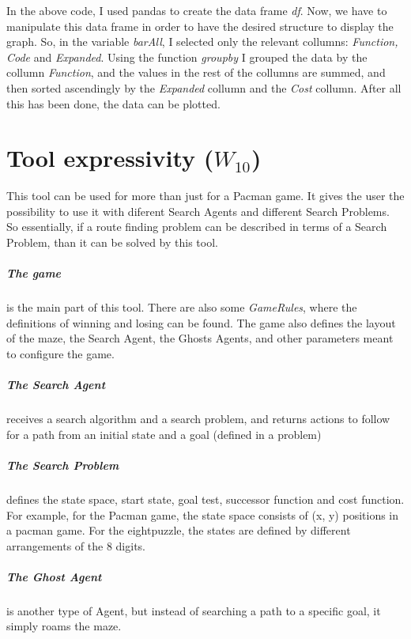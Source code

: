 \documentclass[a4paper,12pt]{report}
\begin{document}
In the above code, I used pandas to create the data frame \textit{df}. Now, we have to manipulate this data frame in order to have the desired structure to display the graph. So, in the variable \textit{barAll}, I selected only the relevant collumns: \textit{Function, Code} and \textit{Expanded}. Using the function \textit{groupby} I grouped the data by the collumn \textit{Function}, and the values in the rest of the collumns are summed, and then sorted ascendingly by the \textit{Expanded} collumn and the \textit{Cost} collumn. After all this has been done, the data can be plotted.

\chapter{Tool expressivity ($W_{10}$)}

This tool can be used for more than just for a Pacman game. It gives the user the possibility to use it with diferent Search Agents and different Search Problems. So essentially, if a route finding problem can be described in terms of a Search Problem, than it can be solved by this tool.

\paragraph{The game} is the main part of this tool. There are also some \textit{GameRules}, where the definitions of winning and losing can be found. The game also defines the layout of the maze, the Search Agent, the Ghosts Agents, and other parameters meant to configure the game.

\paragraph{The Search Agent} receives a search algorithm and a search problem, and returns actions to follow for a path from an initial state and a goal (defined in a problem)

\paragraph{The Search Problem} defines the state space, start state, goal test, successor function and cost function. For example, for the Pacman game, the state space consists of (x, y) positions in a pacman game. For the eightpuzzle, the states are defined by different arrangements of the 8 digits.

\paragraph{The Ghost Agent} is another type of Agent, but instead of searching a path to a specific goal, it simply roams the maze.
\end{document}
